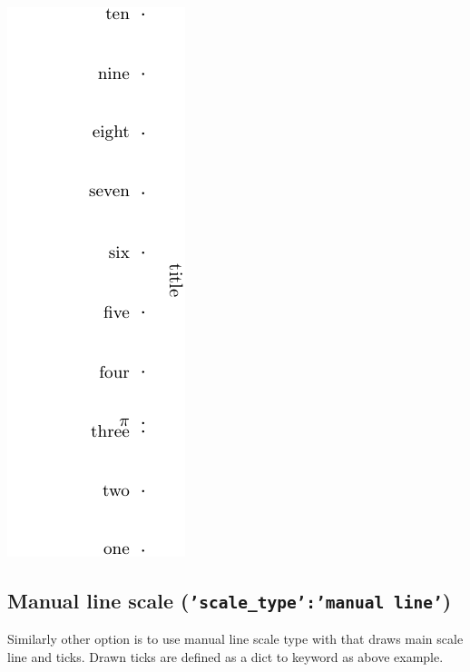 \documentclass[a4paper,11pt,english]{sphinxmanual}
\begin{document}
\includegraphics{ex_axes_5.pdf}


\subsection{Manual line scale (\texttt{'scale\_type':'manual line'})}
\label{axes/axes:manual-line-scale-scale-type-manual-line}
Similarly other option is to use manual line scale type with  that draws main scale line
and ticks. Drawn ticks are defined as a dict to keyword  as above example.
\end{document}
